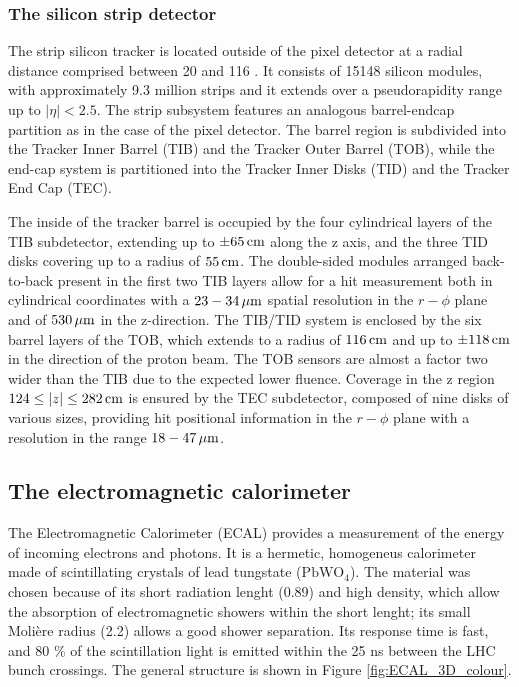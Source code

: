 \subsubsection{The silicon strip detector}
The strip silicon tracker is located outside of the pixel detector at a radial distance comprised between 20 and 116 \cm.
It consists of 15148 silicon modules, with approximately 9.3 million strips and it extends over a pseudorapidity range up to $|\eta| < 2.5$.
The strip subsystem features an analogous barrel-endcap partition as in the case of the pixel detector.
The barrel region is subdivided into the Tracker Inner Barrel (TIB) and the Tracker Outer Barrel (TOB),
while the end-cap system is partitioned into the Tracker Inner Disks (TID) and the Tracker End Cap (TEC).

The inside of the tracker barrel is occupied by the four cylindrical layers of the TIB subdetector,
extending up to $\pm 65 \,\text{cm}$ along the z axis, and the three TID disks covering up to a radius of $55 \,\text{cm}$.
The double-sided modules arranged back-to-back present in the first two TIB layers allow for a hit measurement both in cylindrical coordinates
with a $23-34 \,\mu\text{m}$ spatial resolution in the $r - \phi$ plane and of $530 \,\mu\text{m}$ in the z-direction.
The TIB/TID system is enclosed by the six barrel layers of the TOB, which extends to a radius of $116 \,\text{cm}$ and up to $\pm 118 \,\text{cm}$ in the direction of the proton beam.
The TOB sensors are almost a factor two wider than the TIB due to the expected lower fluence.
Coverage in the z region $124 \le |z| \le 282 \,\text{cm}$ is ensured by the TEC subdetector, composed of nine disks of various sizes,
providing hit positional information in the $r - \phi$ plane with a resolution in the range $18 - 47 \,\mu\text{m}$.

\subsection{The electromagnetic calorimeter}
The Electromagnetic Calorimeter (ECAL) \cite{CERN-LHCC-97-033} provides a measurement of the energy of incoming electrons and photons.
It is a hermetic, homogeneus calorimeter made of scintillating crystals of lead tungstate ($\mathrm{PbWO_4}$).
The material was chosen because of its short radiation lenght (0.89\cm) and high density,
which allow the absorption of electromagnetic showers within the short lenght;
its small Moli\`ere radius (2.2\cm) allows a good shower separation.
Its response time is fast, and 80 \% of the scintillation light is emitted within the 25 ns between the LHC bunch crossings.
The general structure is shown in Figure \ref{fig:ECAL_3D_colour}.

